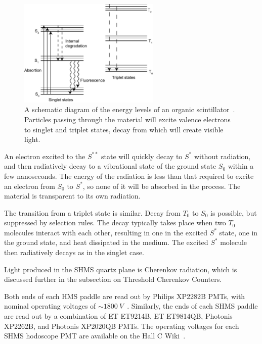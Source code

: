 \begin{figure}[!h]
    \centering
    \includegraphics[width=0.6\textwidth]{chap3/energylevels.pdf}
    \caption[A schematic diagram of the energy levels of an organic
             scintillator]{A schematic diagram of the energy levels of an organic
             scintillator~\cite{Leo_1994}. Particles passing through the
             material will excite valence electrons to singlet and triplet
             states, decay from which will create visible light.}
    \label{fig:leo_scintillator_energy_levels}
\end{figure}

An electron excited to the $S^{**}$ state will quickly decay to $S^*$ without
radiation, and then radiatively decay to a vibrational state of the ground
state $S_0$ within a few nanoseconds.
The energy of the radiation is less than that required to excite an electron
from $S_0$ to $S^*$, so none of it will be absorbed in the process.
The material is transparent to its own radiation.

The transition from a triplet state is similar.
Decay from $T_0$ to $S_0$ is possible, but suppressed by selection rules.
The decay typically takes place when two $T_0$ molecules interact with each
other, resulting in one in the excited $S^*$ state, one in the ground state,
and heat dissipated in the medium. The excited $S^*$ molecule then radiatively
decays as in the singlet case.

Light produced in the SHMS quartz plane is Cherenkov radiation, which is
discussed further in the subsection on Threshold Cherenkov Counters.

Both ends of each HMS paddle are read out by Philips XP2282B PMTs, with
nominal operating voltages of $\sim\SI{1800}{V}$~\cite{HMS_hodoscope_HV}.
Similarly, the ends of each SHMS paddle are read out by a combination of ET
ET9214B, ET ET9814QB, Photonis XP2262B, and Photonis XP2020QB PMTs.
The operating voltages for each SHMS hodoscope PMT are available on the Hall C
Wiki~\cite{SHMS_hodoscope_plastic_HV, SHMS_hodoscope_quartz_HV}.

